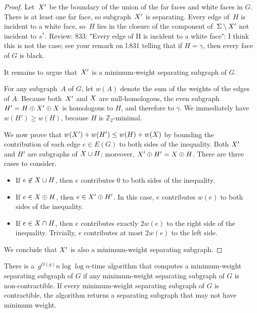 \documentclass[letterpaper,review]{siamart190516}
\def\Z{\mathbb{Z}}
\def\rnote#1{\color{red}Review: #1 \color{black}}
\begin{document}
{\begin{proof}
Let~$X'$ be the boundary of the union of the far faces and white faces in $G$.
There is at least one far face, so subgraph~$X'$ is separating.
Every edge of~$H$ is incident to a white face, so~$H$ lies in the closure of the  component
of~$\Sigma \setminus X'$ not incident to $s^*$. \rnote{833: "Every edge of H is incident to a white face": I think this is not the case; see your remark on l.831 telling that if $H=\gamma$, then every face of $G$ is black. }

It remains to argue that~$X'$ is a minimum-weight separating subgraph of $G$.

For any subgraph~$A$ of $G$, let $w(A)$ denote the sum of the weights of the edges of $A$. Because both~$X'$ and $X$ are null-homologous, the even subgraph $H' = H \oplus X' \oplus X$ is homologous to $H$, and therefore to $\gamma$.  We immediately have $w(H') \ge w(H)$, because $H$ is $\Z_2$-minimal.

  We now prove that $w(X') + w(H') \leq w(H) + w(X)$ by bounding the contribution of each edge $e \in E(G)$ to both sides of the inequality.  Both $X'$ and $H'$ are subgraphs of $X\cup H$; moreover, $X' \oplus H' = X \oplus H$.  There are three cases to consider.
\begin{itemize}
\item
If $e \not\in X\cup H$, then $e$ contributes $0$ to both sides of the inequality.
\item
If $e \in X \oplus H$, then $e \in X' \oplus H'$.  In this case, $e$ contributes $w(e)$ to both sides of the inequality.
\item
If $e \in X \cap H$, then $e$ contributes exactly $2w(e)$ to the right side of the inequality.  Trivially, $e$ contributes at most $2w(e)$ to the left side.
\end{itemize}
We conclude that $X'$ is also a minimum-weight separating subgraph.
\end{proof}

\begin{lemma}
\label{lem:global_split-alg}
There is a~$g^{O(g)} n \log \log n$-time algorithm that computes a minimum-weight separating subgraph of $G$ if any minimum-weight separating subgraph of $G$ is non-contractible.  If every minimum-weight separating subgraph of $G$ is contractible, the algorithm returns a separating subgraph that may not have minimum weight.
\end{lemma}

}
\end{document}
